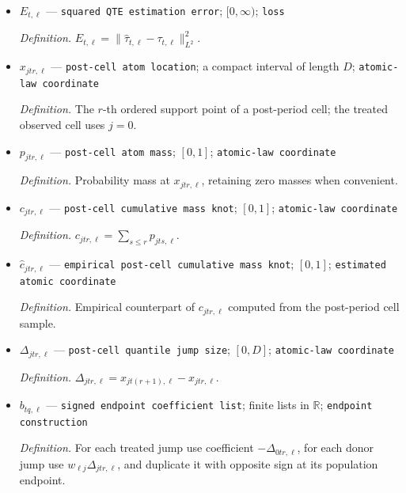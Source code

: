 \documentclass{article}
\begin{document}
\begin{itemize}
  \par\smallskip\noindent\emph{Definition.} \(\widehat\tau_{t,\ell}=\widehat Q^I_{0t,\ell}-\sum_{j=1}^J\widehat w_{\ell j}\widehat Q_{jt,\ell}\).
  \item \(E_{t,\ell}\) --- \texttt{squared QTE estimation error}; \([0,\infty)\); \texttt{loss}
  \par\smallskip\noindent\emph{Definition.} \(E_{t,\ell}=\|\widehat\tau_{t,\ell}-\tau_{t,\ell}\|_{L^2}^2\).
  \item \(x_{jtr,\ell}\) --- \texttt{post-\allowbreak{}cell atom location}; a compact interval of length \(D\); \texttt{atomic-\allowbreak{}law coordinate}
  \par\smallskip\noindent\emph{Definition.} The \(r\)-th ordered support point of a post-period cell; the treated observed cell uses \(j=0\).
  \item \(p_{jtr,\ell}\) --- \texttt{post-\allowbreak{}cell atom mass}; \([0,1]\); \texttt{atomic-\allowbreak{}law coordinate}
  \par\smallskip\noindent\emph{Definition.} Probability mass at \(x_{jtr,\ell}\), retaining zero masses when convenient.
  \item \(c_{jtr,\ell}\) --- \texttt{post-\allowbreak{}cell cumulative mass knot}; \([0,1]\); \texttt{atomic-\allowbreak{}law coordinate}
  \par\smallskip\noindent\emph{Definition.} \(c_{jtr,\ell}=\sum_{s\leq r}p_{jts,\ell}\).
  \item \(\widehat c_{jtr,\ell}\) --- \texttt{empirical post-\allowbreak{}cell cumulative mass knot}; \([0,1]\); \texttt{estimated atomic coordinate}
  \par\smallskip\noindent\emph{Definition.} Empirical counterpart of \(c_{jtr,\ell}\) computed from the post-period cell sample.
  \item \(\Delta_{jtr,\ell}\) --- \texttt{post-\allowbreak{}cell quantile jump size}; \([0,D]\); \texttt{atomic-\allowbreak{}law coordinate}
  \par\smallskip\noindent\emph{Definition.} \(\Delta_{jtr,\ell}=x_{jt(r+1),\ell}-x_{jtr,\ell}\).
  \item \(b_{tq,\ell}\) --- \texttt{signed endpoint coefficient list}; finite lists in \(\mathbb R\); \texttt{endpoint construction}
  \par\smallskip\noindent\emph{Definition.} For each treated jump use coefficient \(-\Delta_{0tr,\ell}\), for each donor jump use \(w_{\ell j}\Delta_{jtr,\ell}\), and duplicate it with opposite sign at its population endpoint.

\end{itemize}
\end{document}
